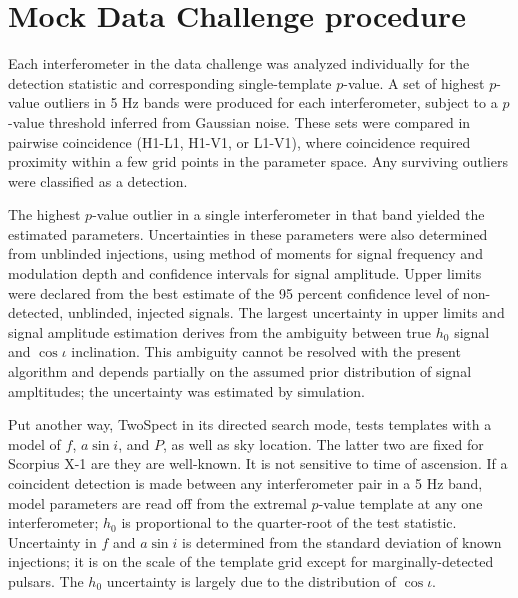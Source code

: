 \section{Mock Data Challenge procedure}

Each interferometer in the data challenge was analyzed individually for 
the detection statistic and corresponding single-template $p$-value. A set
of highest $p$-value outliers in 5 Hz bands were produced for each 
interferometer, subject to a $p$-value threshold inferred from Gaussian noise.
These sets were compared in pairwise coincidence (H1-L1, H1-V1, or L1-V1),
where coincidence required proximity within a few grid points in the 
parameter space. Any surviving outliers were classified as a detection. 

The highest $p$-value outlier in a single interferometer in that band 
yielded the estimated parameters. Uncertainties in these parameters were also
determined from unblinded injections, using method of moments for signal
frequency and modulation depth and confidence intervals for signal
amplitude. Upper limits were declared from the best estimate of the 95
percent confidence level of non-detected, unblinded, injected signals. The
largest uncertainty in upper limits and signal amplitude estimation derives
from the ambiguity between true $h_0$ signal and $\cos \iota$ inclination.
This ambiguity cannot be resolved with the present algorithm and depends
partially on the assumed prior distribution of signal ampltitudes; the
uncertainty was estimated by simulation.

Put another way, TwoSpect
in its directed search mode, tests templates with a model of
$f$, $a \sin i$, and $P$, as well as sky location. The latter two are
fixed for Scorpius X-1 are they are well-known. 
It is not sensitive to time of ascension.
If a coincident detection is made between any interferometer pair in a 5 Hz band,
model parameters are read off from the extremal $p$-value template at
any one interferometer; $h_0$ is proportional to the quarter-root of
the test statistic. Uncertainty in $f$ and $a \sin i$ is determined
from the standard deviation of known injections; it is on the scale
of the template grid except for marginally-detected pulsars. The $h_0$ 
uncertainty is largely due to the distribution of $\cos \iota$. 


